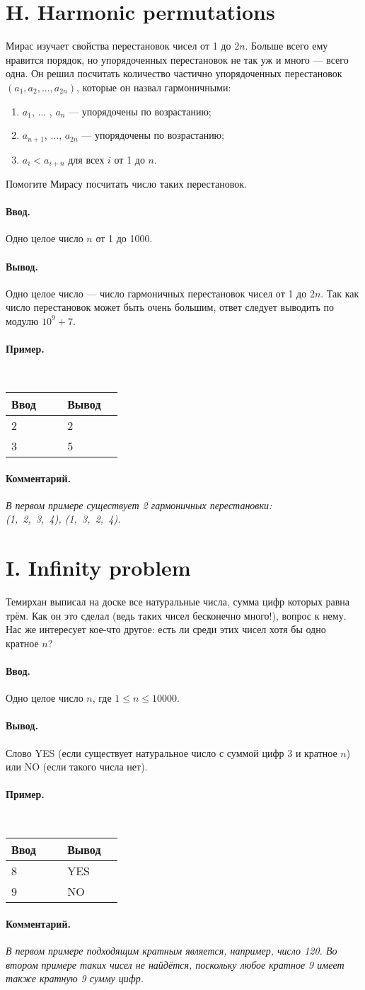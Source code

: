 \documentclass[10pt, a5paper]{article}
\newcommand{\informat}[1]
{
	\paragraph{Ввод.\\} #1
}
\newcommand{\outformat}[1]
{
	\paragraph{Вывод.\\} #1
}
\newcommand{\examplee}[4]
{
	\paragraph{Пример.\\}
	{\tt
	\begin{tabular}{|p{0.4\linewidth}|p{0.4\linewidth}|}
	\hline
	Ввод 	& Вывод  	\\
	\hline
	#1 		& #2 		\\
	\hline
	#3		& #4		\\
	\hline
	\end{tabular}
	}
}
\newcommand{\excomm}[1]
{
	\paragraph{Комментарий. \\}
	\textit{#1}
}
\begin{document}
\section*{H. Harmonic permutations}

Мирас изучает свойства перестановок чисел от 1 до $2n$. Больше всего ему нравится порядок, но упорядоченных перестановок не так уж и много --- всего одна. Он решил посчитать количество частично упорядоченных перестановок $(a_1, a_2, ..., a_{2n})$, которые он назвал гармоничными:

\begin{enumerate}
\item $a_1$, $\dots$ , $a_n$ --- упорядочены по возрастанию;
\item $a_{n+1}$, $\dots$, $a_{2n}$ --- упорядочены по возрастанию;
\item $a_i < a_{i+n}$ для всех $i$ от 1 до $n$.
\end{enumerate}

Помогите Мирасу посчитать число таких перестановок.

\informat{Одно целое число $n$ от 1 до 1000.}

\outformat{Одно целое число --- число гармоничных перестановок чисел от 1 до $2n$. Так как число перестановок может быть очень большим, ответ следует выводить по модулю $10^9 + 7$.}

\examplee{2}{2}{3}{5}

\excomm{В первом примере существует 2 гармоничных перестановки:\\ \mbox{(1, 2, 3, 4)}, \mbox{(1, 3, 2, 4)}.}



\section*{I. Infinity problem}

Темирхан выписал на доске все натуральные числа, сумма цифр которых равна трём. Как он это сделал (ведь таких чисел бесконечно много!), вопрос к нему. Нас же интересует кое-что другое: есть ли среди этих чисел хотя бы одно кратное $n$?

\informat{Одно целое число $n$, где $1 \le n \le 10 000$.}

\outformat{Слово YES (если существует натуральное число с суммой цифр 3 и кратное $n$) или NO (если такого числа нет).}

\examplee{8}{YES}{9}{NO}

\excomm{В первом примере подходящим кратным является, например, число 120. Во втором примере таких чисел не найдётся, поскольку любое кратное 9 имеет также кратную 9 сумму цифр.}
\end{document}
